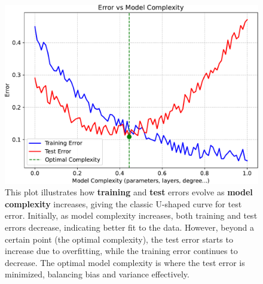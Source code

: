 \begin{figure}[!htp]
    \centering
    \includegraphics[width=\textwidth]{img/neural-networks-and-overfitting/error-vs-model-complexity.pdf}
    \caption{This plot illustrates how \textbf{training} and \textbf{test} errors evolve as \textbf{model complexity} increases, giving the classic U-shaped curve for test error. Initially, as model complexity increases, both training and test errors decrease, indicating better fit to the data. However, beyond a certain point (the optimal complexity), the test error starts to increase due to overfitting, while the training error continues to decrease. The optimal model complexity is where the test error is minimized, balancing bias and variance effectively.}
\end{figure}